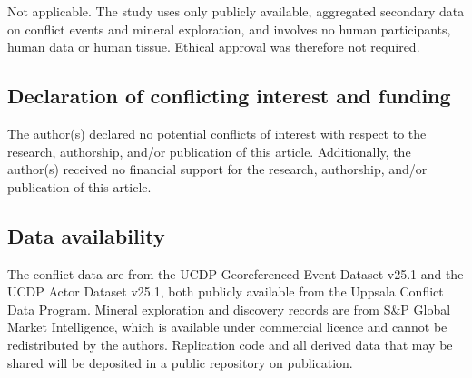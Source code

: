 \documentclass[11pt]{article}
\begin{document}
Not applicable. The study uses only publicly available, aggregated secondary data
on conflict events and mineral exploration, and involves no human participants,
human data or human tissue. Ethical approval was therefore not required.



\subsection*{Declaration of conflicting interest and funding }

The author(s) declared no potential conflicts of interest with respect to the
research, authorship, and/or publication of this article. Additionally, the author(s) received no financial support for the research, authorship,
and/or publication of this article.

\subsection*{Data availability}

The conflict data are from the UCDP Georeferenced Event Dataset v25.1 and the
UCDP Actor Dataset v25.1, both publicly available from the Uppsala Conflict Data
Program. Mineral exploration and discovery records are from S\&P Global Market
Intelligence, which is available under commercial licence and cannot be
redistributed by the authors. Replication code and all derived data that may be
shared will be deposited in a public repository on publication.
\end{document}
